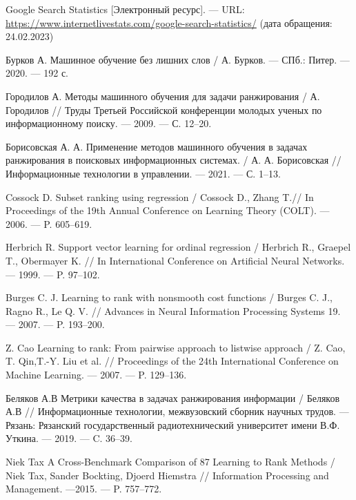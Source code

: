 
\renewcommand\bibname{СПИСОК ИСПОЛЬЗОВАННЫХ ИСТОЧНИКОВ}
\begin{thebibliography}{}

 Google Search Statistics [Электронный ресурс]. --- URL: \url{https://www.internetlivestats.com/google-search-statistics/} (дата обращения: 24.02.2023)

 Бурков А. Машинное обучение без лишних слов / А. Бурков. --- СПб.: Питер. --- 2020. --- 192 с.

 Городилов А. Методы машинного обучения для задачи ранжирования / А. Городилов // Труды Третьей Российской конференции молодых ученых по информационному поиску. --- 2009. --- С. 12--20.

 Борисовская А. А. Применение методов машинного обучения в задачах ранжирования в поисковых информационных системах. / А. А. Борисовская // Информационные технологии в управлении. --- 2021. --- С. 1--13.

 Cossock D. Subset ranking using regression / Cossock D., Zhang T.// In Proceedings of the 19th Annual Conference on Learning Theory (COLT). --- 2006. --- P. 605–619.

 Herbrich R. Support vector learning for ordinal regression / Herbrich R., Graepel T., Obermayer K. // In International Conference on Artificial Neural Networks. --- 1999. ---
P. 97--102.

 Burges C. J. Learning to rank with nonsmooth cost functions / Burges C. J., Ragno R., Le Q. V. // Advances in Neural Information Processing Systems 19. --- 2007. --- P. 193--200.

 Z. Cao Learning to rank: From pairwise approach to listwise approach / Z. Cao, T. Qin,T.-Y. Liu et al. // Proceedings of the 24th International Conference on Machine Learning. --- 2007. --- P. 129--136.

 Беляков А.В Метрики качества в задачах ранжирования информации / Беляков А.В // Информационные технологии, межвузовский сборник научных трудов. --- Рязань: Рязанский государственный радиотехнический университет имени В.Ф. Уткина. --- 2019. --- C. 36--39.

 Niek Tax A Cross-Benchmark Comparison of 87 Learning to Rank Methods / Niek Tax, Sander Bockting, Djoerd Hiemstra // Information Processing and Management. ---2015. --- P. 757--772.


\end{thebibliography}
